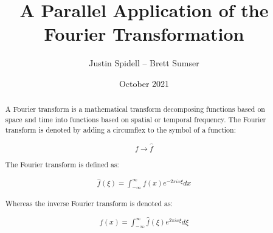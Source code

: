\documentclass[12pt]{extarticle}
\title{A Parallel Application of the Fourier Transformation}
\author{Justin Spidell -- Brett Sumser}
\date{October 2021}
\begin{document}
 
\maketitle
\newpage
\begin{abstract}

A Fourier transform is a mathematical transform decomposing functions based on space and time into functions based on spatial or temporal frequency. The Fourier transform is denoted by adding a circumflex to the symbol of a function:

\begin{align*}
f \rightarrow \hat{f}
\end{align*}

The Fourier transform is defined as:

\begin{align}
\hat{f} (\xi)= \int^{\infty}_{-\infty}f(x) e^{-2 \pi i x \xi}dx
\end{align}

Whereas the inverse Fourier transform is denoted as:

\begin{align}
{f} (x)= \int^{\infty}_{-\infty}\hat{f}(\xi) e^{2 \pi i x \xi}d\xi
\end{align}

\end{abstract}


\end{document}
